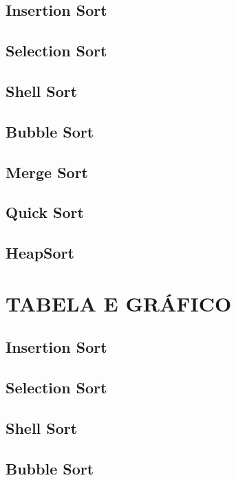 \documentclass[12pt,arial]{article}
\begin{document}
		\subsection{Insertion Sort}
		
        \newpage
  	\subsection{Selection Sort}
		
  	\subsection{Shell Sort}
		
  	\subsection{Bubble Sort}
		
        \subsection{Merge Sort}
		
        \subsection{Quick Sort}
		
        \subsection{HeapSort}
		
	    \newpage
     
	
		\section{TABELA E GRÁFICO}
        \subsection{Insertion Sort}
		
        \newpage
        \subsection{Selection Sort}
		
        \newpage
        \subsection{Shell Sort}
		
        \newpage
        \subsection{Bubble Sort}
		
        \newpage
\end{document}
